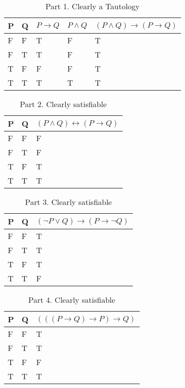 \documentclass[12pt]{article}
\newenvironment{solution}[2][Solution]{ \begin{trivlist}
\item[\hskip \labelsep {\bfseries #1}]}{\end{trivlist}}
\begin{document}
\begin{solution}{2}
\item[]
\begin{table}[!h]
\centering
\caption{Part 1. Clearly a Tautology}
\label{my-label}
\begin{tabular}{|l|l|l|l|l|}
\hline
P & Q & $P \rightarrow Q$ & $P \wedge Q$ & $(P \wedge Q) \rightarrow (P \rightarrow Q)$ \\ \hline
F & F & T               & F          & T                                          \\ \hline
F & T & T               & F          & T                                          \\ \hline
T & F & F               & F          & T                                          \\ \hline
T & T & T               & T          & T                                          \\ \hline
\end{tabular}
\end{table}

\begin{table}[!h]
\centering
\caption{Part 2. Clearly satisfiable}
\label{my-label}
\begin{tabular}{|l|l|l|}
\hline
P & Q & $(P \wedge Q) \leftrightarrow (P \rightarrow Q)$ \\ \hline
F & F & F \\ \hline
F & T & F \\ \hline
T & F & T \\ \hline
T & T & T \\ \hline
\end{tabular}
\end{table}

\begin{table}[!h]
\centering
\caption{Part 3. Clearly satisfiable}
\label{my-label}
\begin{tabular}{|l|l|l|}
\hline
P & Q & $(\lnot P \vee Q) \rightarrow (P \rightarrow \lnot Q)$ \\ \hline
F & F & T \\ \hline
F & T & T \\ \hline
T & F & T \\ \hline
T & T & F \\ \hline
\end{tabular}
\end{table}

\begin{table}[!h]
\centering
\caption{Part 4. Clearly satisfiable}
\label{my-label}
\begin{tabular}{|l|l|l|}
\hline
P & Q & $(((P \rightarrow Q) \rightarrow P) \rightarrow Q)$ \\ \hline
F & F & T \\ \hline
F & T & T \\ \hline
T & F & F \\ \hline
T & T & T \\ \hline
\end{tabular}
\end{table}


\end{solution}
\end{document}
